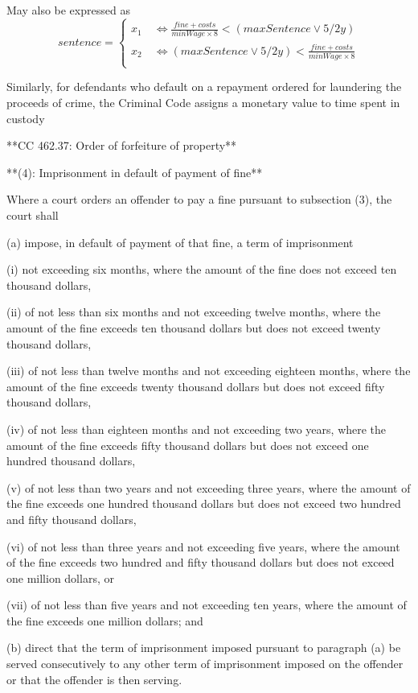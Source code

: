 May also be expressed as
\begin{equation*}
sentence =\begin{cases}
x_1 \quad  \iff \frac{fine + costs}{minWage \times 8} < (maxSentence \lor 5/2y) \\
x_2 \quad \iff (maxSentence \lor 5/2y) < \frac{fine + costs}{minWage \times 8}  \\
\end{cases}
\end{equation*}

Similarly, for defendants who default on a repayment ordered for laundering the proceeds of crime, the Criminal Code assigns a monetary value to time spent in custody

**CC 462.37: Order of forfeiture of property**

**(4): Imprisonment in default of payment of fine**

Where a court orders an offender to pay a fine pursuant to subsection (3), the court shall

(a) impose, in default of payment of that fine, a term of imprisonment

(i) not exceeding six months, where the amount of the fine does not exceed ten thousand dollars,

(ii) of not less than six months and not exceeding twelve months, where the amount of the fine exceeds ten thousand dollars but does not exceed twenty thousand dollars,

(iii) of not less than twelve months and not exceeding eighteen months, where the amount of the fine exceeds twenty thousand dollars but does not exceed fifty thousand dollars,

(iv) of not less than eighteen months and not exceeding two years, where the amount of the fine exceeds fifty thousand dollars but does not exceed one hundred thousand dollars,

(v) of not less than two years and not exceeding three years, where the amount of the fine exceeds one hundred thousand dollars but does not exceed two hundred and fifty thousand dollars,

(vi) of not less than three years and not exceeding five years, where the amount of the fine exceeds two hundred and fifty thousand dollars but does not exceed one million dollars, or

(vii) of not less than five years and not exceeding ten years, where the amount of the fine exceeds one million dollars; and

(b) direct that the term of imprisonment imposed pursuant to paragraph (a) be served consecutively to any other term of imprisonment imposed on the offender or that the offender is then serving.

